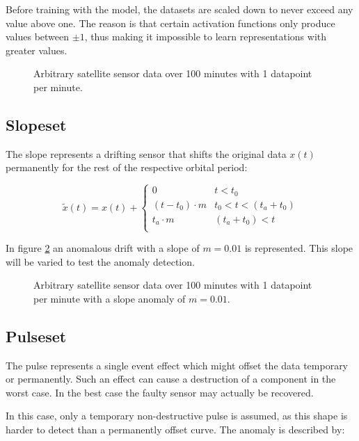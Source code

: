 	Before training with the model, the datasets are scaled down to never exceed any value above one. The reason is that certain activation functions only produce values between $\pm 1$, thus making it impossible to learn representations with greater values.

	\begin{figure}[htb]
	\centering
	
	\caption{Arbitrary satellite sensor data over 100 minutes with 1 datapoint per minute.}
	\label{f:trainingset}
	\end{figure}

	\subsection{Slopeset}
	The slope represents a drifting sensor that shifts the original data $x(t)$ permanently for the rest of the respective orbital period:
	
	\begin{equation}
	\tilde{x}(t) = x(t) + \begin{cases} 
	0 & t < t_0 \\
	(t - t_0) \cdot m & t_0 < t < (t_a+t_0)\\ 
	t_a \cdot m & (t_a+t_0) < t \\
	\end{cases}
	\end{equation}

	In figure \ref{f:slopeset} an anomalous drift with a slope of $m=0.01$ is represented. This slope will be varied to test the anomaly detection.	
	
	\begin{figure}[htb]
	\centering
	
	\caption{Arbitrary satellite sensor data over 100 minutes with 1 datapoint per minute with a slope anomaly of $m=0.01$.}
	\label{f:slopeset}
	\end{figure}
	
	\subsection{Pulseset}
	The pulse represents a single event effect which might offset the data temporary or permanently. Such an effect can cause a destruction of a component in the worst case. In the best case the faulty sensor may actually be recovered. 
	
	In this case, only a temporary non-destructive pulse is assumed, as this shape is harder to detect than a permanently offset curve. The anomaly is described by:
	
